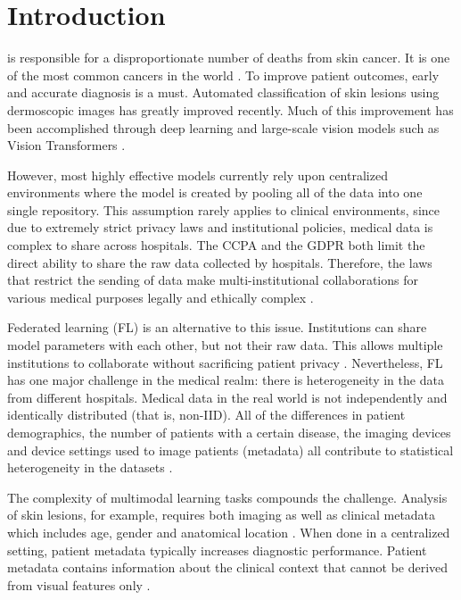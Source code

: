 \documentclass{ieeeaccess}
\begin{document}
\section{Introduction}
\label{sec:introduction}
 is responsible for a disproportionate number of deaths from skin cancer. It is one of the most common cancers in the world \cite{Arnold2022,Hay2014}. To improve patient outcomes, early and accurate diagnosis is a must. Automated classification of skin lesions using dermoscopic images has greatly improved recently. Much of this improvement has been accomplished through deep learning and large-scale vision models such as Vision Transformers \cite{Naeem2025}.

However, most highly effective models currently rely upon centralized environments where the model is created by pooling all of the data into one single repository. This assumption rarely applies to clinical environments, since due to extremely strict privacy laws and institutional policies, medical data is complex to share across hospitals. The CCPA and the GDPR both limit the direct ability to share the raw data collected by hospitals. Therefore, the laws that restrict the sending of data make multi-institutional collaborations for various medical purposes legally and ethically complex \cite{Voigt2017,Law2023}.

Federated learning (FL) is an alternative to this issue. Institutions can share model parameters with each other, but not their raw data. This allows multiple institutions to collaborate without sacrificing patient privacy \cite{McMahan2017,Rieke2020}. Nevertheless, FL has one major challenge in the medical realm: there is heterogeneity in the data from different hospitals. Medical data in the real world is not independently and identically distributed (that is, non-IID). All of the differences in patient demographics, the number of patients with a certain disease, the imaging devices and device settings used to image patients (metadata) all contribute to statistical heterogeneity in the datasets \cite{Zhao2018,Li2020}.

The complexity of multimodal learning tasks compounds the challenge. Analysis of skin lesions, for example, requires both imaging as well as clinical metadata which includes age, gender and anatomical location \cite{Nunnari2020,Gessert2020}. When done in a centralized setting, patient metadata typically increases diagnostic performance. Patient metadata contains information about the clinical context that cannot be derived from visual features only \cite{Gessert2020,Nunnari2020}.
\end{document}
